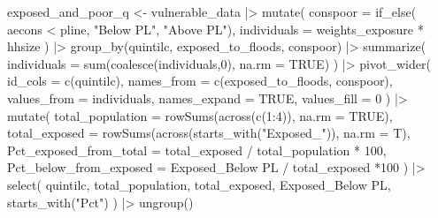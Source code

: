 \documentclass[
  letterpaper,
  DIV=11,
  numbers=noendperiod]{scrartcl}
\newenvironment{Shaded}{}{}
\newcommand{\AttributeTok}[1]{\textcolor[rgb]{0.84,0.23,0.29}{#1}}
\newcommand{\ConstantTok}[1]{\textcolor[rgb]{0.00,0.36,0.77}{#1}}
\newcommand{\DecValTok}[1]{\textcolor[rgb]{0.00,0.36,0.77}{#1}}
\newcommand{\FunctionTok}[1]{\textcolor[rgb]{0.44,0.26,0.76}{#1}}
\newcommand{\NormalTok}[1]{\textcolor[rgb]{0.14,0.16,0.18}{#1}}
\newcommand{\OtherTok}[1]{\textcolor[rgb]{0.44,0.26,0.76}{#1}}
\newcommand{\SpecialCharTok}[1]{\textcolor[rgb]{0.00,0.36,0.77}{#1}}
\newcommand{\StringTok}[1]{\textcolor[rgb]{0.01,0.18,0.38}{#1}}
\begin{document}
\begin{Shaded}
\begin{Highlighting}[]
\NormalTok{exposed\_and\_poor\_q }\OtherTok{\textless{}{-}}\NormalTok{ vulnerable\_data }\SpecialCharTok{|\textgreater{}}
  \FunctionTok{mutate}\NormalTok{(}
    \AttributeTok{conspoor =} \FunctionTok{if\_else}\NormalTok{(}
\NormalTok{      aecons }\SpecialCharTok{\textless{}}\NormalTok{ pline, }\StringTok{"Below PL"}\NormalTok{, }\StringTok{"Above PL"}\NormalTok{),}
    \AttributeTok{individuals =}\NormalTok{ weights\_exposure }\SpecialCharTok{*}\NormalTok{ hhsize}
\NormalTok{  ) }\SpecialCharTok{|\textgreater{}} 
  \FunctionTok{group\_by}\NormalTok{(quintilc, exposed\_to\_floods, conspoor) }\SpecialCharTok{|\textgreater{}} 
  \FunctionTok{summarize}\NormalTok{(}
    \AttributeTok{individuals =} \FunctionTok{sum}\NormalTok{(}\FunctionTok{coalesce}\NormalTok{(individuals,}\DecValTok{0}\NormalTok{), }\AttributeTok{na.rm =} \ConstantTok{TRUE}\NormalTok{)}
\NormalTok{  ) }\SpecialCharTok{|\textgreater{}} 
  \FunctionTok{pivot\_wider}\NormalTok{(}
    \AttributeTok{id\_cols =} \FunctionTok{c}\NormalTok{(quintilc),}
    \AttributeTok{names\_from =} \FunctionTok{c}\NormalTok{(exposed\_to\_floods, conspoor),}
    \AttributeTok{values\_from =}\NormalTok{ individuals,}
    \AttributeTok{names\_expand =} \ConstantTok{TRUE}\NormalTok{,}
    \AttributeTok{values\_fill =} \DecValTok{0}
\NormalTok{  ) }\SpecialCharTok{|\textgreater{}} 
  \FunctionTok{mutate}\NormalTok{(}
    \AttributeTok{total\_population =} \FunctionTok{rowSums}\NormalTok{(}\FunctionTok{across}\NormalTok{(}\FunctionTok{c}\NormalTok{(}\DecValTok{1}\SpecialCharTok{:}\DecValTok{4}\NormalTok{)), }\AttributeTok{na.rm =} \ConstantTok{TRUE}\NormalTok{),}
    \AttributeTok{total\_exposed =} \FunctionTok{rowSums}\NormalTok{(}\FunctionTok{across}\NormalTok{(}\FunctionTok{starts\_with}\NormalTok{(}\StringTok{"Exposed\_"}\NormalTok{)), }\AttributeTok{na.rm =}\NormalTok{ T),}
    \AttributeTok{Pct\_exposed\_from\_total =}\NormalTok{ total\_exposed }\SpecialCharTok{/}\NormalTok{ total\_population }\SpecialCharTok{*} \DecValTok{100}\NormalTok{,}
    \AttributeTok{Pct\_below\_from\_exposed =} \StringTok{\textasciigrave{}}\AttributeTok{Exposed\_Below PL}\StringTok{\textasciigrave{}} \SpecialCharTok{/}\NormalTok{ total\_exposed }\SpecialCharTok{*}\DecValTok{100}
\NormalTok{  ) }\SpecialCharTok{|\textgreater{}} 
  \FunctionTok{select}\NormalTok{(}
\NormalTok{    quintilc,}
\NormalTok{    total\_population,}
\NormalTok{    total\_exposed,}
    \StringTok{\textasciigrave{}}\AttributeTok{Exposed\_Below PL}\StringTok{\textasciigrave{}}\NormalTok{,}
    \FunctionTok{starts\_with}\NormalTok{(}\StringTok{"Pct"}\NormalTok{)}
\NormalTok{  ) }\SpecialCharTok{|\textgreater{}} 
  \FunctionTok{ungroup}\NormalTok{()}


\end{Highlighting}
\end{Shaded}
\end{document}
